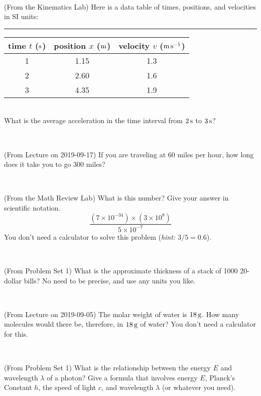 \documentclass[12pt, letterpaper]{article}
\begin{document}
\vfill ~

\begin{problem} (From the Kinematics Lab)
Here is a data table of times, positions, and velocities in SI units:\\
\rule{1.0in}{0pt}\begin{tabular}{c|c|c}
time $t$ ($\mathrm{s}$) & position $x$ ($\mathrm{m}$) & velocity $v$ ($\mathrm{m}\,\mathrm{s}^{-1}$) \\
\hline
1 & 1.15 & 1.3 \\
2 & 2.60 & 1.6 \\
3 & 4.35 & 1.9 \\
\hline
\end{tabular}\\
What is the average acceleration in the time interval from $2\,\mathrm{s}$ to $3\,\mathrm{s}$?
\end{problem}


\vfill ~

\begin{problem} (From Lecture on 2019-09-17)
If you are traveling at 60 miles per hour, how long does
it take you to go 300 miles?
\end{problem}


\vfill ~


\clearpage


\begin{problem} (From the Math Review Lab)
What is this number? Give your answer in scientific notation.
$$
\frac{(7\times10^{-34})\times(3\times10^8)}{5\times10^{-7}}
$$
You don't need a calculator to solve this problem (\textit{hint: $3/5=0.6$}).
\end{problem}


\vfill ~

\begin{problem} (From Problem Set 1)
What is the approximate thickness of a stack of 1000 20-dollar bills?
No need to be precise, and use any units you like.
\end{problem}


\vfill ~

\begin{problem} (From Lecture on 2019-09-05)
The molar weight of water is $18\,\mathrm{g}$. How many molecules would there
be, therefore, in $18\,\mathrm{g}$ of water? You don't need a calculator for
this.
\end{problem}


\vfill ~

\begin{problem} (From Problem Set 1)
What is the relationship between the energy $E$ and wavelength
$\lambda$ of a photon? Give a formula that involves energy $E$,
Planck's Constant $h$, the speed of light $c$, and wavelength
$\lambda$ (or whatever you need).
\end{problem}
\end{document}
